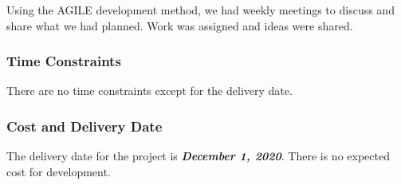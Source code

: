 \documentclass[12pt]{article}
\begin{document}
Using the AGILE development method, we had weekly meetings to discuss and share what we had planned. Work was assigned and ideas were shared.

\subsubsection{Time Constraints}

There are no time constraints except for the delivery date.
\subsubsection{ Cost and Delivery Date}

 The delivery date for the project is
\textbf{\emph{December 1, 2020}}. There is no expected cost for development.
\end{document}
